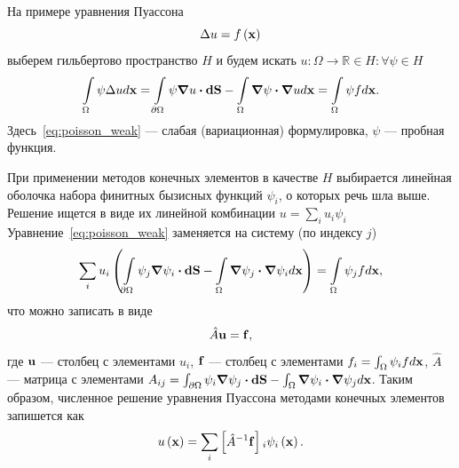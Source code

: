 \documentclass[oneside,final,12pt]{extreport}
\newcommand\bcdot[0]{\boldsymbol\cdot}
\begin{document}
На примере уравнения Пуассона
\begin{equation} \Delta u = f\left(\vb x\right) \label{eq:poisson_strong}\end{equation}
выберем гильбертово пространство $H$ и будем искать
$u: \Omega \rightarrow \mathbb{R} \in H: \forall \psi \in H$
\begin{equation}
  \int\limits_\Omega \psi \Delta u d\vb x =
  \int\limits_{\partial\Omega} \psi \grad u \bcdot \vb{dS} -
    \int\limits_\Omega \grad\psi \bcdot \grad u d\vb x =
  \int\limits_\Omega \psi f d\vb x.
\label{eq:poisson_weak}
\end{equation}
Здесь~\eqref{eq:poisson_weak} --- слабая (вариационная) формулировка,
$\psi$ --- пробная функция.

При применении методов конечных элементов в качестве $H$ выбирается линейная
оболочка набора финитных бызисных функций $\psi_i$, о которых речь шла выше.
Решение ищется в виде их линейной комбинации $u = \sum_i u_i\psi_i$
Уравнение~\eqref{eq:poisson_weak} заменяется на систему (по индексу $j$)
\begin{equation}
  \sum_i u_i \left(
    \int\limits_{\partial\Omega} \psi_j \grad \psi_i \bcdot \vb{dS} -
    \int\limits_\Omega \grad\psi_j \bcdot \grad \psi_i d\vb x
  \right) =
  \int\limits_\Omega \psi_j f d\vb x,
\label{eq:poisson_FEM}
\end{equation}
что можно записать в виде
\begin{equation}
  \hat{A}\vb u = \vb f,
\label{eq:poisson_FEM_obscure}
\end{equation}
где $\vb u$ --- столбец с элементами $u_i$,
$\vb f$ --- столбец с элементами $f_i = \int_\Omega\psi_i f d\vb x$,
$\hat{A}$ --- матрица с элементами $A_{ij} =
  \int_{\partial\Omega} \psi_i \grad \psi_j \bcdot \vb{dS} -
    \int_\Omega \grad\psi_i \bcdot \grad \psi_j d\vb x$.
Таким образом, численное решение уравнения Пуассона методами конечных элементов
запишется как
\begin{equation}
  u\left(\vb x\right) =
    \sum_i\left[\hat{A}^{-1}\vb f\right]{}_i\psi_i\left(\vb x\right).
\end{equation}
\end{document}
